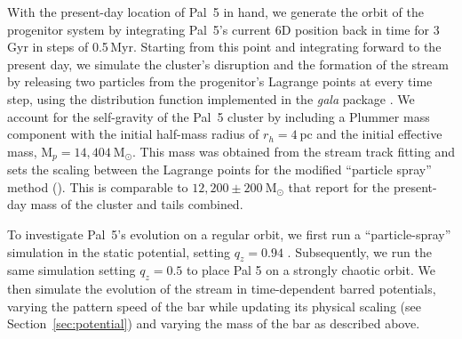 \documentclass[twocolumn]{aastex62}
\newcommand{\package}[1]{\textsl{#1}}
\newcommand{\msun}{\textrm{M}_\odot}
\newcommand{\ab}[1]{{\color{teal} AB: #1}}
\newcommand{\sa}[1]{{\color{magenta} SP: #1}}
\begin{document}
With the present-day location of Pal~5 in hand, we generate the orbit of the progenitor system by integrating Pal~5's current 6D position back in time for 3\,Gyr in steps of 0.5\,Myr.
Starting from this point and integrating forward to the present day, we simulate the cluster's disruption and the formation of the stream by releasing two particles from the progenitor's Lagrange points at every time step, using the \citet{Fardal:2015} distribution function implemented in the \package{gala} package \citep{gala}.
We account for the self-gravity of the Pal~5 cluster by including a Plummer mass component with the initial half-mass radius of $r_h = 4~\textrm{pc}$ and the initial effective mass, $\textrm{M}_p = 14,404~\msun$.
This mass was obtained from the stream track fitting and sets the scaling between the Lagrange points for the modified ``particle spray'' method (\citealt{Fardal:2015}).
This is comparable to $12,200 \pm 200~\msun$ that \citet{Ibata:2017} report for the present-day mass of the cluster and tails combined.

To investigate Pal~5's evolution on a regular orbit, we first run a ``particle-spray'' simulation in the static potential, setting $q_z = 0.94$ \citep{Bovy:2016}.
Subsequently, we run the same simulation setting $q_z = 0.5$ to place Pal 5 on a strongly chaotic orbit.
We then simulate the evolution of the stream in time-dependent barred potentials, varying the pattern speed of the bar while updating its physical scaling (see Section~\ref{sec:potential}) and varying the mass of the bar as described above.
\end{document}
